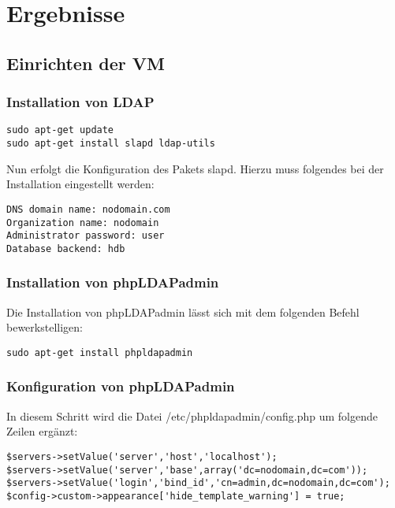 
\section{Ergebnisse}
\label{sec:Ergebnisse}

\subsection{Einrichten der VM}
\label{sec:Einrichten der VM}

\subsubsection{Installation von LDAP}
\label{sec:Installation von LDAP}

\begin{lstlisting}[frame=single, caption=Installation von LDAP]
sudo apt-get update
sudo apt-get install slapd ldap-utils
\end{lstlisting}

Nun erfolgt die Konfiguration des Pakets slapd. Hierzu muss folgendes bei der Installation eingestellt werden:
\begin{lstlisting}[frame=single, caption=Konfiguration von slapd]
DNS domain name: nodomain.com
Organization name: nodomain
Administrator password: user
Database backend: hdb
\end{lstlisting}

\subsubsection{Installation von phpLDAPadmin}
\label{sec:Installation von phpLDAPadmin}
Die Installation von phpLDAPadmin lässt sich mit dem folgenden Befehl bewerkstelligen:
\begin{lstlisting}[frame=single, caption=Installation von phpLDAPadmin]
sudo apt-get install phpldapadmin
\end{lstlisting}

\subsubsection{Konfiguration von phpLDAPadmin}
\label{sec:Konfiguration von phpLDAPadmin}
In diesem Schritt wird die Datei /etc/phpldapadmin/config.php um folgende Zeilen ergänzt:
\begin{lstlisting}[frame=single, caption=Konfiguration von phpLDAPadmin]
$servers->setValue('server','host','localhost');
$servers->setValue('server','base',array('dc=nodomain,dc=com'));
$servers->setValue('login','bind_id','cn=admin,dc=nodomain,dc=com');
$config->custom->appearance['hide_template_warning'] = true;
\end{lstlisting}

